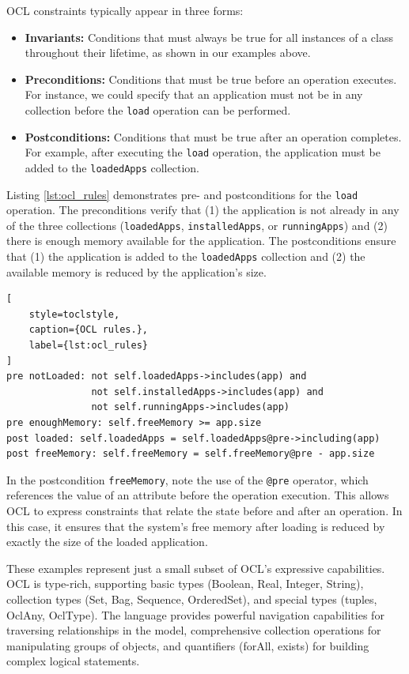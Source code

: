 OCL constraints typically appear in three forms:
\begin{itemize}
    \item \textbf{Invariants:} Conditions that must always be true for all instances 
    of a class throughout their lifetime, as shown in our examples above.
    
    \item \textbf{Preconditions:} Conditions that must be true before an operation 
    executes. For instance, we could specify that an application must not be in any
    collection before the \texttt{load} operation can be performed.
    
    \item \textbf{Postconditions:} Conditions that must be true after an operation 
    completes. For example, after executing the \texttt{load} operation, the application
    must be added to the \texttt{loadedApps} collection.
\end{itemize}

Listing \ref{lst:ocl_rules} demonstrates pre- and postconditions for the \texttt{load} 
operation. The preconditions verify that (1) the application is not already in any of the
three collections (\texttt{loadedApps}, \texttt{installedApps}, or \texttt{runningApps}) 
and (2) there is enough memory available for the application. The postconditions 
ensure that (1) the application is added to the \texttt{loadedApps} collection and (2) the 
available memory is reduced by the application's size.

\begin{lstlisting}[
    style=toclstyle, 
    caption={OCL rules.}, 
    label={lst:ocl_rules}
]
pre notLoaded: not self.loadedApps->includes(app) and
               not self.installedApps->includes(app) and
               not self.runningApps->includes(app)
pre enoughMemory: self.freeMemory >= app.size
post loaded: self.loadedApps = self.loadedApps@pre->including(app)
post freeMemory: self.freeMemory = self.freeMemory@pre - app.size
\end{lstlisting}

In the postcondition \texttt{freeMemory}, note the use of the \texttt{@pre} 
operator, which references the value of an attribute before the operation execution. 
This allows OCL to express constraints that relate the state before and after an 
operation. In this case, it ensures that the system's free memory after loading 
is reduced by exactly the size of the loaded application.

These examples represent just a small subset of OCL's expressive capabilities. 
OCL is type-rich, supporting basic types (Boolean, Real, Integer, String), collection 
types (Set, Bag, Sequence, OrderedSet), and special types (tuples, OclAny, OclType). 
The language provides powerful navigation capabilities for traversing relationships 
in the model, comprehensive collection operations for manipulating groups of objects, 
and quantifiers (forAll, exists) for building complex logical statements.

